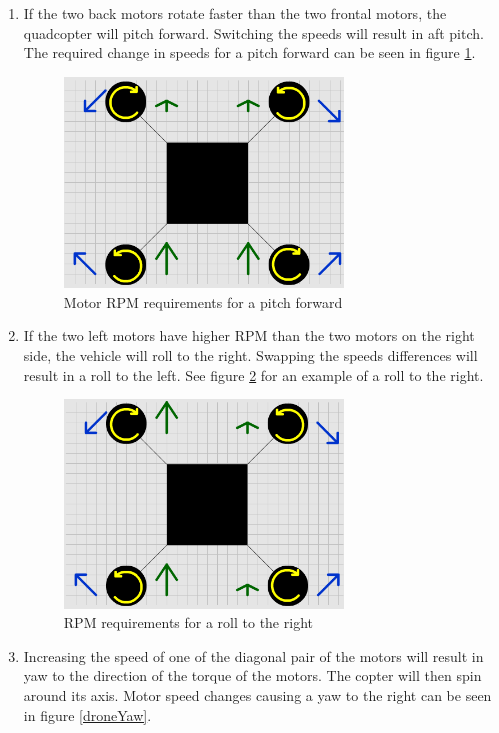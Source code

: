 \begin{enumerate}
\item If the two back motors rotate faster than the two frontal motors, the quadcopter will pitch forward. Switching the speeds will result in aft pitch. The required change in speeds for a pitch forward can be seen in figure \ref{dronePitch}.
\begin{figure}[H]
  \centering
    \includegraphics[width=0.7\textwidth]{images/dronePitch.png}
	\caption{Motor RPM requirements for a pitch forward}
	\label{dronePitch}
\end{figure}
\item If the two left motors have higher RPM than the two motors on the right side, the vehicle will roll to the right. Swapping the speeds differences will result in a roll to the left. See figure \ref{droneRoll} for an example of a roll to the right.
\begin{figure}[H]
  \centering
    \includegraphics[width=0.7\textwidth]{images/droneRoll.png}
	\caption{RPM requirements for a roll to the right}
	\label{droneRoll}
\end{figure}
\item Increasing the speed of one of the diagonal pair of the motors will result in yaw to the direction of the torque of the motors. The copter will then spin around its axis. Motor speed changes causing a yaw to the right can be seen in figure \ref{droneYaw}.

\end{enumerate}
